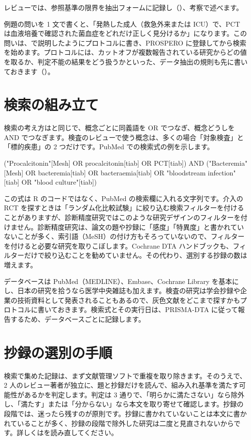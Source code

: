 レビューでは、参照基準の限界を抽出フォームに記録し（）、考察で述べます。

例題の問いを 1 文で書くと、「発熱した成人（救急外来または ICU）で、PCT は血液培養で確認された菌血症をどれだけ正しく見分けるか」になります。この問いは、で説明したようにプロトコルに書き、PROSPERO に登録してから検索を始めます。プロトコルには、カットオフが複数報告されている研究からどの値を取るか、判定不能の結果をどう扱うかといった、データ抽出の規則も先に書いておきます（）。

\section{検索の組み立て}
\label{sec:11-2}

検索の考え方はと同じで、概念ごとに同義語を OR でつなぎ、概念どうしを AND でつなぎます。検査のレビューで使う概念は、多くの場合「対象検査」と「標的疾患」の 2 つだけです。PubMed での検索式の例を示します。

\begin{rcode}
("Procalcitonin"[Mesh] OR procalcitonin[tiab] OR PCT[tiab])
AND
("Bacteremia"[Mesh] OR bacteremia[tiab] OR bacteraemia[tiab]
 OR "bloodstream infection"[tiab] OR "blood culture"[tiab])
\end{rcode}

この式は R のコードではなく、PubMed の検索欄に入れる文字列です。介入の RCT を探すときは「ランダム化比較試験」に絞り込む検索フィルターを付けることがありますが、診断精度研究ではこのような研究デザインのフィルターを付けません。診断精度研究は、論文の題や抄録に「感度」「特異度」と書かれていないことが多く、索引語（MeSH）の付け方もそろっていないので、フィルターを付けると必要な研究を取りこぼします。Cochrane DTA ハンドブックも、フィルターだけで絞り込むことを勧めていません。その代わり、選別する抄録の数は増えます。

データベースは PubMed（MEDLINE）、Embase、Cochrane Library を基本にし、日本の研究を拾うなら医学中央雑誌も加えます。検査の研究は学会抄録や企業の技術資料として発表されることもあるので、灰色文献をどこまで探すかもプロトコルに書いておきます。検索式とその実行日は、PRISMA-DTA に従って報告するため、データベースごとに記録します。

\section{抄録の選別の手順}
\label{sec:11-3}

検索で集めた記録は、まず文献管理ソフトで重複を取り除きます。そのうえで、2 人のレビュー著者が独立に、題と抄録だけを読んで、組み入れ基準を満たす可能性があるかを判定します。判定は 3 通りで、「明らかに満たさない」なら除外し、「満たす」または「分からない」なら本文を取り寄せて確認します。抄録の段階では、迷ったら残すのが原則です。抄録に書かれていないことは本文に書かれていることが多く、抄録の段階で除外した研究は二度と見直されないからです。詳しくはを読み直してください。


